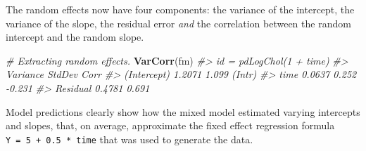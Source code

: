 \documentclass[]{book}
\newenvironment{Shaded}{\begin{snugshade}}{\end{snugshade}}
\newcommand{\KeywordTok}[1]{\textcolor[rgb]{0.13,0.29,0.53}{\textbf{#1}}}
\newcommand{\DataTypeTok}[1]{\textcolor[rgb]{0.13,0.29,0.53}{#1}}
\newcommand{\DecValTok}[1]{\textcolor[rgb]{0.00,0.00,0.81}{#1}}
\newcommand{\StringTok}[1]{\textcolor[rgb]{0.31,0.60,0.02}{#1}}
\newcommand{\CommentTok}[1]{\textcolor[rgb]{0.56,0.35,0.01}{\textit{#1}}}
\newcommand{\OperatorTok}[1]{\textcolor[rgb]{0.81,0.36,0.00}{\textbf{#1}}}
\newcommand{\NormalTok}[1]{#1}
\begin{document}
\begin{Shaded}
\end{Shaded}

The random effects now have four components: the variance of the
intercept, the variance of the slope, the residual error \emph{and} the
correlation between the random intercept and the random slope.

\begin{Shaded}
\begin{Highlighting}[]
\CommentTok{# Extracting random effects.}
\KeywordTok{VarCorr}\NormalTok{(fm)}
\CommentTok{#> id = pdLogChol(1 + time) }
\CommentTok{#>             Variance StdDev Corr  }
\CommentTok{#> (Intercept) 1.2071   1.099  (Intr)}
\CommentTok{#> time        0.0637   0.252  -0.231}
\CommentTok{#> Residual    0.4781   0.691}
\end{Highlighting}
\end{Shaded}

Model predictions clearly show how the mixed model estimated varying
intercepts and slopes, that, on average, approximate the fixed effect
regression formula \texttt{Y\ =\ 5\ +\ 0.5\ *\ time} that was used to
generate the data.
\end{document}
